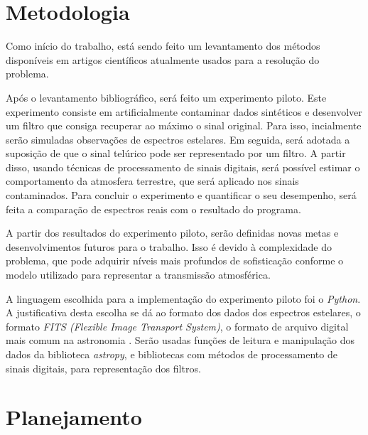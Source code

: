\documentclass[11pt,twoside,a4paper]{article}
\begin{document}
\section{Metodologia}
\doublespacing
Como início do trabalho, está sendo feito um levantamento dos métodos disponíveis em artigos científicos atualmente usados para a resolução do problema. 

Após o levantamento bibliográfico, será feito um experimento piloto. Este experimento consiste em artificialmente contaminar dados sintéticos e desenvolver um filtro que consiga recuperar ao máximo o sinal original. Para isso, incialmente serão simuladas observações de espectros estelares. Em seguida, será adotada a suposição de que o sinal telúrico pode ser representado por um filtro. A partir disso, usando técnicas de processamento de sinais digitais, será possível estimar o comportamento da atmosfera terrestre, que será aplicado nos sinais contaminados. Para concluir o experimento e quantificar o seu desempenho, será feita a comparação de espectros reais com o resultado do programa.

A partir dos resultados do experimento piloto, serão definidas novas metas e desenvolvimentos futuros para o trabalho. Isso é devido à complexidade do problema, que pode adquirir níveis mais profundos de sofisticação conforme o modelo utilizado para representar a transmissão atmosférica.

A linguagem escolhida para a implementação do experimento piloto foi o \textit{Python}. A justificativa desta escolha se dá ao formato dos dados dos espectros estelares, o formato \textit{FITS (Flexible Image Transport System)}, o formato de arquivo digital mais comum na astronomia \cite{2010A&A...524A..42P}. Serão usadas funções de leitura e manipulação dos dados da biblioteca \textit{astropy}, e bibliotecas com métodos de processamento de sinais digitais, para representação dos filtros.



\newpage
\section{Planejamento}\label{sec:planejamento}
\doublespacing
\end{document}
